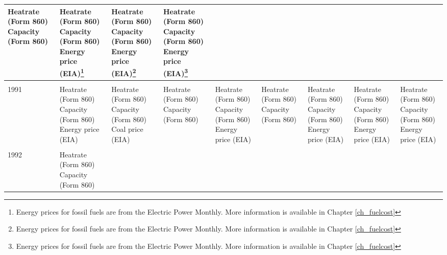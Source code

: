 \documentclass[10pt]{report}
\begin{document}
\begin{scriptsize}
\begin{landscape}
\begin{center}
\begin{longtable}{|lllllllll|}
\shortstack{Heatrate (Form 860) \\ Capacity (Form 860)} &
\shortstack{Heatrate (Form 860) \\ Capacity (Form 860) \\ Energy price (EIA)\footnote{Energy prices for fossil fuels are from the Electric Power Monthly. More information is available in Chapter \ref{ch_fuelcost}}} &
\shortstack{Heatrate (Form 860) \\ Capacity (Form 860) \\ Energy price (EIA)\footnote{Energy prices for fossil fuels are from the Electric Power Monthly. More information is available in Chapter \ref{ch_fuelcost}}} &
\shortstack{Heatrate (Form 860) \\ Capacity (Form 860) \\ Energy price (EIA)\footnote{Energy prices for fossil fuels are from the Electric Power Monthly. More information is available in Chapter \ref{ch_fuelcost}}}\\
\hline \\
1991 & \shortstack{Heatrate (Form 860) \\ Capacity (Form 860) \\ Energy price (EIA)} &
\shortstack{Heatrate (Form 860) \\ Capacity (Form 860) \\ Coal price (EIA)} &
\shortstack{Heatrate (Form 860) \\ Capacity (Form 860)} &
\shortstack{Heatrate (Form 860) \\ Capacity (Form 860) \\ Energy price (EIA)} &
\shortstack{Heatrate (Form 860) \\ Capacity (Form 860)} &
\shortstack{Heatrate (Form 860) \\ Capacity (Form 860) \\ Energy price (EIA)} &
\shortstack{Heatrate (Form 860) \\ Capacity (Form 860) \\ Energy price (EIA)} &
\shortstack{Heatrate (Form 860) \\ Capacity (Form 860) \\ Energy price (EIA)} \\
\hline \\
1992 & \shortstack{Heatrate (Form 860) \\ Capacity (Form 860)}  &

\end{longtable}
\end{center}
\end{landscape}
\end{scriptsize}
\end{document}
